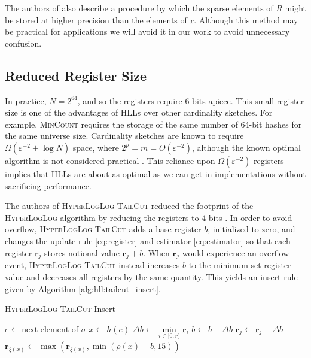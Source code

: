 \documentclass[10]{article}
\newcommand{\algoname}[1]{\textnormal{\textsc{#1}}}
\begin{document}
The authors of \cite{heule2013hyperloglog} also describe a procedure by which the sparse elements of $R$ might be stored at higher precision than the elements of $\mathbf{r}$.
Although this method may be practical for applications we will avoid it in our work to avoid unnecessary confusion.







\subsection{Reduced Register Size}
 \label{DS:sec:HLL:reduced}

In practice, $N= 2^{64}$, and so the registers require 6 bits apiece.
This small register size is one of the advantages of \algoname{HLL}s over other cardinality sketches.
For example, \algoname{MinCount} requires the storage of the same number of 64-bit hashes for the same universe size. 
Cardinality sketches are known to require $\Omega(\varepsilon^{-2} + \log N)$ space, where $2^p = m = O(\varepsilon^{-2})$, although the known optimal algorithm is not considered practical \cite{kane2010optimal}.
This reliance upon $\Omega(\varepsilon^{-2})$ registers implies that \algoname{HLL}s are about as optimal as we can get in implementations without sacrificing performance.

The authors of \algoname{HyperLogLog-TailCut} reduced the footprint of the \algoname{HyperLogLog} algorithm by reducing the registers to 4 bits \cite{xiao2017better}.
In order to avoid overflow, \algoname{HyperLogLog-TailCut} adds a base register $b$, initialized to zero, and changes the update rule \eqref{eq:register} and estimator \eqref{eq:estimator} so that each register $\mathbf{r}_j$ stores notional value $\mathbf{r}_j + b$. 
When $\mathbf{r}_j$ would experience an overflow event, \algoname{HyperLogLog-TailCut} instead increases $b$ to the minimum set register value and decreases all registers by the same quantity. 
This yields an insert rule given by Algorithm \ref{alg:hll:tailcut_insert}.
\begin{algorithm}
\caption{\algoname{HyperLogLog-TailCut} Insert}\label{alg:hll:tailcut_insert}
\begin{algorithmic}[1]
	\State $e \gets \text{next element of $\sigma$}$
	\State $x \gets h(e)$
		\State $\Delta b \gets \min\limits_{i \in [0, r)} \mathbf{r}_i$
			\State $b \gets b + \Delta b$
			\For {$j \in [0,r)$}
				\State $\mathbf{r}_j \gets \mathbf{r}_j - \Delta b$
			\EndFor
		\EndIf
	\EndIf
	\State $\mathbf{r}_{\xi(x)} \gets \max ( \mathbf{r}_{\xi(x)}, \min ( \rho(x) - b, 15))$
\end{algorithmic}
\end{algorithm}
\end{document}
